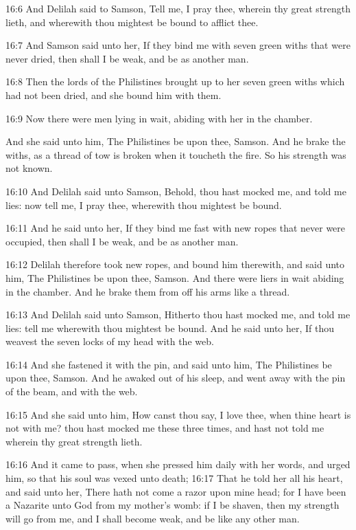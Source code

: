 16:6 And Delilah said to Samson, Tell me, I pray thee, wherein thy
great strength lieth, and wherewith thou mightest be bound to afflict
thee.

16:7 And Samson said unto her, If they bind me with seven green withs
that were never dried, then shall I be weak, and be as another man.

16:8 Then the lords of the Philistines brought up to her seven green
withs which had not been dried, and she bound him with them.

16:9 Now there were men lying in wait, abiding with her in the
chamber.

And she said unto him, The Philistines be upon thee, Samson. And he
brake the withs, as a thread of tow is broken when it toucheth the
fire. So his strength was not known.

16:10 And Delilah said unto Samson, Behold, thou hast mocked me, and
told me lies: now tell me, I pray thee, wherewith thou mightest be
bound.

16:11 And he said unto her, If they bind me fast with new ropes that
never were occupied, then shall I be weak, and be as another man.

16:12 Delilah therefore took new ropes, and bound him therewith, and
said unto him, The Philistines be upon thee, Samson. And there were
liers in wait abiding in the chamber. And he brake them from off his
arms like a thread.

16:13 And Delilah said unto Samson, Hitherto thou hast mocked me, and
told me lies: tell me wherewith thou mightest be bound. And he said
unto her, If thou weavest the seven locks of my head with the web.

16:14 And she fastened it with the pin, and said unto him, The
Philistines be upon thee, Samson. And he awaked out of his sleep, and
went away with the pin of the beam, and with the web.

16:15 And she said unto him, How canst thou say, I love thee, when
thine heart is not with me? thou hast mocked me these three times, and
hast not told me wherein thy great strength lieth.

16:16 And it came to pass, when she pressed him daily with her words,
and urged him, so that his soul was vexed unto death; 16:17 That he
told her all his heart, and said unto her, There hath not come a razor
upon mine head; for I have been a Nazarite unto God from my mother's
womb: if I be shaven, then my strength will go from me, and I shall
become weak, and be like any other man.

